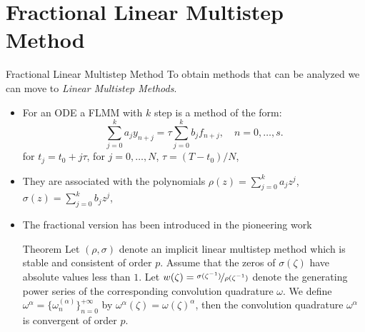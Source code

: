 \documentclass[aspectratio=169,xcolor=dvipsnames]{beamer}
\begin{document}
\section{Fractional Linear Multistep Method}

\begin{frame}{Fractional Linear Multistep Method}
To obtain methods that can be analyzed we can move to \emph{Linear Multistep Methods}.

\begin{itemize}
	\item<2-> For an ODE a FLMM with $k$ step is a method of the form:
	\begin{equation}
	\label{four} \sum_{j=0}^{k} a_{j} y_{n+j} = \tau
	\sum_{j=0}^{k} b_{j} f_{n+j}, \quad n=0, \dots,
	s.
	\end{equation} 
	for $t_j=t_0+j\tau$, for $j=0,\ldots,N$, $\tau=(T-t_0)/N$,
	\item<3-> They are associated with the polynomials $\rho(z) = \sum_{j=0}^{k} a_j z^j$, $\sigma(z) = \sum_{j=0}^k b_j z^j$,
	\item<4-> The fractional version has been introduced in the pioneering work \parencite{LubichFLMM}
	\begin{alertblock}{Theorem \parencite[Theorem~2.6]{LubichFLMM}}
	Let $(\rho,\sigma)$ denote an implicit linear multistep method which is stable and consistent of order $p$. Assume that the zeros
	of $\sigma(\zeta)$ have absolute values less than $1$. Let $w(\zeta) = \nicefrac{\sigma(\zeta^{-1})}{\rho(\zeta^{-1})}$ denote
	the generating power series of the corresponding convolution quadrature $\omega$. We define $\omega^\alpha = \{\omega_n^{(\alpha)}\}_{n=0}^{+\infty}$
	by $\omega^\alpha(\zeta) = \omega(\zeta)^\alpha$, then the convolution quadrature $\omega^\alpha$ is convergent of order $p$.
	\end{alertblock}
\end{itemize}
\end{frame}
\end{document}

